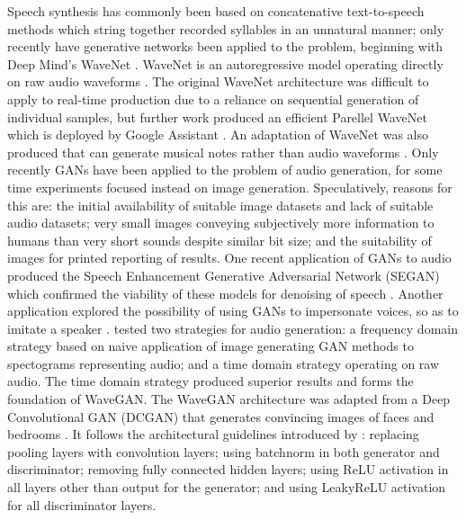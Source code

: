 \documentclass[a4paper, dvipsnames, titlepage]{article}
\begin{document}
Speech synthesis has commonly been based on concatenative text-to-speech methods which string together recorded syllables in an unnatural manner; only recently have generative networks been applied to the problem, beginning with Deep Mind's WaveNet \citep{waveNetUrl}.
WaveNet is an autoregressive model operating directly on raw audio waveforms \citep{DBLP:journals/corr/OordDZSVGKSK16}.
\newline
\newline
The original WaveNet architecture was difficult to apply to real-time production due to a reliance on sequential generation of individual samples, but further work produced an efficient Parellel WaveNet which is deployed by Google Assistant \citep{2017arXiv171110433V}.
An adaptation of WaveNet was also produced that can generate musical notes rather than audio waveforms \citep{2017arXiv170401279E}.
\newline
\newline
Only recently GANs have been applied to the problem of audio generation, for some time experiments focused instead on image generation.
Speculatively, reasons for this are: the initial availability of suitable image datasets and lack of suitable audio datasets; very small images conveying subjectively more information to humans than very short sounds despite similar bit size; and the suitability of images for printed reporting of results.
\newline
\newline
One recent application of GANs to audio produced the Speech Enhancement Generative Adversarial Network (SEGAN) which confirmed the viability of these models for denoising of speech \citep{2017arXiv170309452P}.
Another application explored the possibility of using GANs to impersonate voices, so as to imitate a speaker \citep{2018arXiv180206840G}.
\newline
\newline
\citeauthor{2018arXiv180204208D} tested two strategies for audio generation: a frequency domain strategy based on naive application of image generating GAN methods to spectograms representing audio; and a time domain strategy operating on raw audio.
The time domain strategy produced superior results and forms the foundation of WaveGAN.
\newline
\newline
The WaveGAN architecture was adapted from a Deep Convolutional GAN (DCGAN) that generates convincing images of faces and bedrooms \citep{2015arXiv151106434R}.
It follows the architectural guidelines introduced by \citeauthor{2015arXiv151106434R}: replacing pooling layers with convolution layers; using batchnorm in both generator and discriminator; removing fully connected hidden layers; using ReLU activation in all layers other than output for the generator; and using LeakyReLU activation for all discriminator layers.
\end{document}
